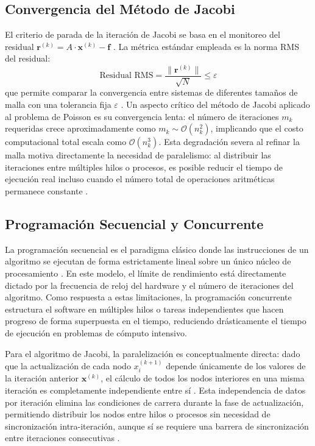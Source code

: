 \subsection{Convergencia del Método de Jacobi}

El criterio de parada de la iteración de Jacobi se basa en el monitoreo del residual
$\mathbf{r}^{(k)} = A \cdot \mathbf{x}^{(k)} - \mathbf{f}$ \parencite{burkardt2011jacobi}.
La métrica estándar empleada es la norma RMS del residual:
\begin{equation}
    \text{Residual RMS} = \frac{\|\mathbf{r}^{(k)}\|}{\sqrt{N}} \leq \varepsilon
    \label{eq:residual_rms}
\end{equation}
que permite comparar la convergencia entre sistemas de diferentes tamaños de malla con
una tolerancia fija $\varepsilon$ \parencite{burkardt2011jacobi}. Un aspecto crítico del método
de Jacobi aplicado al problema de Poisson es su convergencia lenta: el número de
iteraciones $m_k$ requeridas crece aproximadamente como $m_k \sim \mathcal{O}(n_k^2)$,
implicando que el costo computacional total escala como $\mathcal{O}(n_k^3)$. 
Esta degradación severa al refinar la malla motiva directamente la necesidad de paralelismo: al 
distribuir las iteraciones entre múltiples hilos o procesos, es posible reducir el tiempo de 
ejecución real incluso cuando el número total de operaciones aritméticas permanece constante \parencite{briggs2000multigrid}.

\subsection{Programación Secuencial y Concurrente}

La programación secuencial es el paradigma clásico donde las instrucciones de un
algoritmo se ejecutan de forma estrictamente lineal sobre un único núcleo de
procesamiento \parencite{benari2006principles}. En este modelo, el límite de rendimiento está
directamente dictado por la frecuencia de reloj del hardware y el número de iteraciones
del algoritmo. Como respuesta a estas limitaciones, la programación concurrente estructura
el software en múltiples hilos o tareas independientes que hacen progreso de forma
superpuesta en el tiempo, reduciendo drásticamente el tiempo de ejecución en problemas de
cómputo intensivo.

Para el algoritmo de Jacobi, la paralelización es conceptualmente directa: dado que la
actualización de cada nodo $x_i^{(k+1)}$ depende únicamente de los valores de la
iteración anterior $\mathbf{x}^{(k)}$, el cálculo de todos los nodos interiores en una
misma iteración es completamente independiente entre sí \parencite{burkardt2011jacobi}. Esta
independencia de datos por iteración elimina las condiciones de carrera durante la fase de
actualización, permitiendo distribuir los nodos entre hilos o procesos sin necesidad de
sincronización intra-iteración, aunque sí se requiere una barrera de sincronización entre
iteraciones consecutivas \parencite{silberschatz2018os}.

